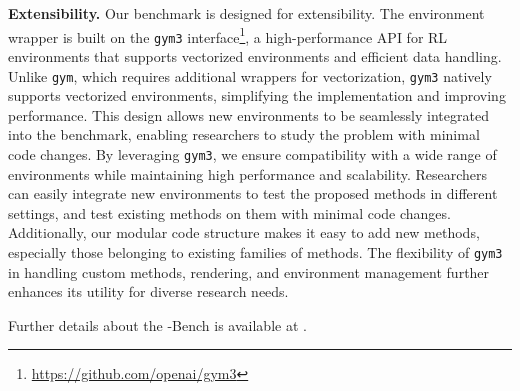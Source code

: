 \textbf{Extensibility.}  
Our benchmark is designed for extensibility. The environment wrapper is built on the \texttt{gym3} interface\footnote{\url{https://github.com/openai/gym3}}, a high-performance API for RL environments that supports vectorized environments and efficient data handling. Unlike \texttt{gym}, which requires additional wrappers for vectorization, \texttt{gym3} natively supports vectorized environments, simplifying the implementation and improving performance. This design allows new environments to be seamlessly integrated into the benchmark, enabling researchers to study the \ourMethod problem with minimal code changes. By leveraging \texttt{gym3}, we ensure compatibility with a wide range of environments while maintaining high performance and scalability. Researchers can easily integrate new environments to test the proposed methods in different settings, and test existing methods on them with minimal code changes. Additionally, our modular code structure makes it easy to add new methods, especially those belonging to existing families of methods. The flexibility of \texttt{gym3} in handling custom methods, rendering, and environment management further enhances its utility for diverse research needs.

Further details about the \ourMethod-Bench is available at .


